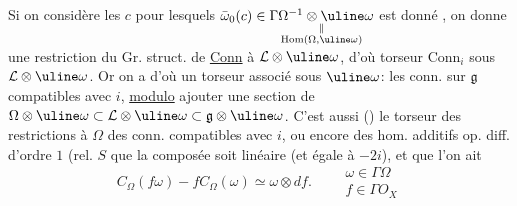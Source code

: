 Si on considère les $c$ pour lesquels
$\bar\omega_0(c)\in\underset{\substack{\Vert\\\operatorname{Hom}(\Omega,\uline\omega)}}{\Gamma\Omega^{-1}\otimes\uline\omega}$
est donné , on donne une restriction
du Gr. struct. de \uline{Conn} à $\mathcal L\otimes\uline\omega$,
d'où torseur $\mathrm{Conn}_i$ sous $\mathcal L\otimes\uline\omega$. Or on a
d'où un torseur associé sous $\uline\omega$: les conn.
sur $\mathfrak g$ compatibles avec $i$, \uline{modulo} 
ajouter une section de $\Omega\otimes\uline\omega\subset\mathcal L\otimes\uline\omega\subset\mathfrak g\otimes\uline\omega$.
C'est aussi () le torseur des restrictions
à $\Omega$ des conn. compatibles avec $i$, ou encore
des hom. additifs op. diff. d'ordre $1$ (rel. $S$
 que la composée
soit linéaire (et égale à $-2i$), et que l'on ait
\[
C_\Omega(f\omega)-fC_\Omega(\omega)\simeq\omega\otimes df.
\qquad\begin{array}{l}\omega\in\Gamma\Omega\\f\in\Gamma O_X\end{array}
\]

